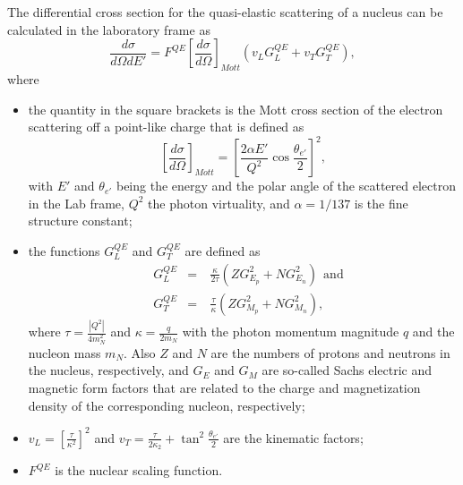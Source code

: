 The differential cross section for the quasi-elastic scattering of a nucleus can be calculated in the laboratory frame as
\begin{equation}
\frac{d\sigma}{d\Omega dE'} = F^{QE}\left [ \frac{d\sigma}{d\Omega} \right ]_{Mott}\left (v_{L}G_{L}^{QE} + v_{T}G_{T}^{QE} \right ),
\end{equation}
where \vspace{-1em}
\begin{itemize}
\item the quantity in the square brackets is the Mott cross section of the electron scattering off a point-like charge that is defined as
\begin{equation}
\left [ \frac{d\sigma}{d\Omega} \right ]_{Mott} = \left [ \frac{2\alpha E'}{Q^{2}}\cos \frac{\theta_{e'}}{2} \right ]^{2},
\label{eq:mott}
\end{equation}
with $E'$ and $\theta_{e'}$ being the energy and the polar angle of the scattered electron in the Lab frame, $Q^{2}$ the photon virtuality, and $\alpha=1/137$ is the fine structure constant;   \vspace{-0.5em}
\item the functions $G_{L}^{QE}$ and $G_{T}^{QE}$ are defined as
\begin{equation}
\begin{aligned}
&G_{L}^{QE}&=~&\frac{\kappa}{2\tau}\left ( ZG_{E_{p}}^{2}+NG_{E_{n}}^{2} \right )~~\textrm{and}\\
&G_{T}^{QE}&=~&\frac{\tau}{\kappa}\left ( ZG_{M_{p}}^{2}+NG_{M_{n}}^{2} \right ),
\label{eq:eee}
\end{aligned}
\end{equation}
where $\tau = \frac{|Q^{2}|}{4m_{N}^{2}}$ and $\kappa = \frac{q}{2m_{N}}$ with the photon momentum magnitude $q$ and the nucleon mass $m_{N}$. Also $Z$ and $N$ are the numbers of protons and neutrons in the nucleus, respectively, and $G_{E}$ and $G_{M}$ are so-called Sachs electric and magnetic form factors that are related to the charge and magnetization density of the corresponding nucleon, respectively;  \vspace{-0.25em}
\item  $v_{L} = \left [\frac{\tau}{\kappa^{2}} \right ]^{2} $ and $v_{T} = \frac{\tau}{2\kappa_{2}} +\tan^{2}{\frac{\theta_{e'}}{2}}$ are the kinematic factors;\vspace{-0.25em} 
\item $F^{QE}$ is the nuclear scaling function.\vspace{-0.25em}
\end{itemize}

